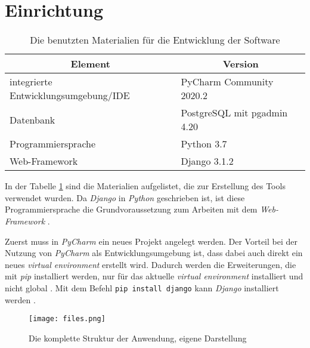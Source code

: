 \documentclass[11pt,a4paper]{report}
\begin{document}
\section{Einrichtung}

\begin{table}
\centering
\begin{tabular}{|p{}|p{}|}
\hline
\multicolumn{1}{|c|}{\textbf{Element}} & 
\multicolumn{1}{|c|}{\textbf{Version}} \\\hline
integrierte Entwicklungsumgebung/IDE & PyCharm Community 2020.2 \\\hline
Datenbank & PostgreSQL mit pgadmin 4.20 \\\hline
Programmiersprache & Python 3.7 \\\hline   
Web-Framework & Django 3.1.2 \\\hline   
\end{tabular}
\caption{Die benutzten Materialien für die Entwicklung der Software}
\label{t:tools}
\end{table}

In der Tabelle \ref{t:tools} sind die Materialien aufgelistet, die zur Erstellung des Tools verwendet wurden. Da \textit{Django} in \textit{Python} geschrieben ist, ist diese Programmiersprache die Grundvoraussetzung zum Arbeiten mit dem \textit{Web-Framework} \cite{djangotuto2}.


Zuerst muss in \textit{PyCharm} ein neues Projekt angelegt werden. Der Vorteil bei der Nutzung von \textit{PyCharm} als Entwicklungsumgebung ist, dass dabei auch direkt ein neues \textit{virtual environment} erstellt wird. Dadurch werden die Erweiterungen, die mit \textit{pip} installiert werden, nur für das aktuelle \textit{virtual environment} installiert und nicht global \cite{mozillatuto2}. Mit dem Befehl \verb|pip install django| kann \textit{Django} installiert werden \cite{djangotuto3}.


\begin{figure}[htpb]
  \centering
  \texttt{[image: files.png]}
  \caption{Die komplette Struktur der Anwendung, eigene Darstellung}
  \label{f:files}
\end{figure}
\end{document}
